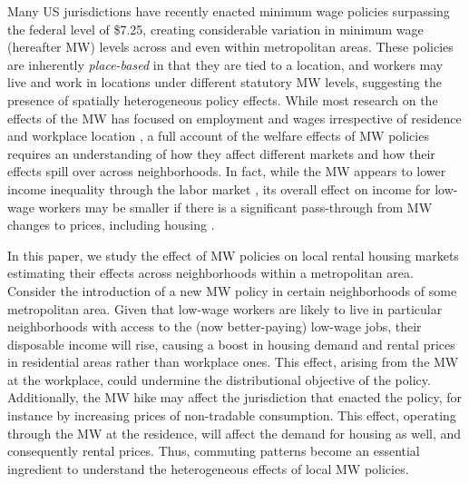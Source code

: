 

Many US jurisdictions have recently enacted minimum wage policies surpassing the 
federal level of \$7.25, creating considerable variation in minimum wage 
(hereafter MW) levels across and even within metropolitan areas.
These policies are inherently \textit{place-based} in that they are tied to 
a location, and workers may live and work in locations under different 
statutory MW levels, suggesting the presence of spatially heterogeneous policy 
effects.
While most research on the effects of the MW has focused on employment and 
wages irrespective of residence and workplace location
\parencite[e.g.,][]{CardKrueger1994, CegnizEtAl2019},
a full account of the welfare effects of MW policies requires an understanding 
of how they affect different markets and how their effects spill over across 
neighborhoods.
In fact, while the MW appears to lower income inequality through the labor 
market \parencite{Lee1999, AutorEtAl2016},
its overall effect on income for low-wage workers may be smaller if there is 
a significant pass-through from MW changes to prices, including housing
\parencite{Macurdy2015}.

In this paper, we study the effect of MW policies on local rental housing 
markets estimating their effects across neighborhoods within a metropolitan
area.
Consider the introduction of a new MW policy in certain neighborhoods of some
metropolitan area.
Given that low-wage workers are likely to live in particular neighborhoods with 
access to the (now better-paying) low-wage jobs,
their disposable income will rise, causing a boost in housing demand and rental 
prices in residential areas rather than workplace ones.
This effect, arising from the MW at the workplace, could undermine the 
distributional objective of the policy.
Additionally, the MW hike may affect the jurisdiction that enacted the policy, 
for instance by increasing prices of non-tradable consumption.
This effect, operating through the MW at the residence, will affect the 
demand for housing as well, and consequently rental prices.
Thus, commuting patterns become an essential ingredient to understand the 
heterogeneous effects of local MW policies.

